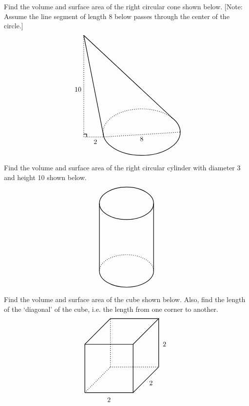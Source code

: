 \documentclass[11pt,letterpaper]{article}
\begin{document}

 Find the volume and surface area of the right circular cone shown below. [Note: Assume the line segment of length 8 below passes through the center of the circle.]
	\[
	\begin{tikzpicture}
	\draw[line width=0.03cm] (-1.96,-0.25) -- (-3,5);
	\draw[line width=0.03cm] (1.58,0.735) -- (-3,5);    
	                                                           
	\draw[line width=0.03cm,dotted] (-3,5) -- (-3,-0.25) -- (-1.96,-0.25);
	\draw[line width=0.03cm] (-3,-0.1) -- (-2.85,-0.1) -- (-2.85,-0.25);
	\node at (-3.3,2.2) {$10$};
	
	\draw[line width=0.03cm,dotted] (-1.96,-0.25) -- (2,0);
	\node at (0,-0.35) {$8$};
	
	\node at (-2.4,-0.5) {$2$};
	
	\draw[line width=0.03cm,dotted] (2, 0) arc [start angle=0, end angle=180, x radius= 2, y radius= 1.2];
	\draw[line width=0.03cm] (-2, 0) arc [start angle=180, end angle=400, x radius= 2, y radius= 1.2];	
	\end{tikzpicture}
	\]



\newpage



 Find the volume and surface area of the right circular cylinder with diameter 3 and height 10 shown below.
	\[
	\begin{tikzpicture}[scale=0.7]
	\draw[line width=0.03cm] (0,5) ellipse (2 and 1.2);
	\draw[line width=0.03cm] (-2,5) -- (-2,0);
	\draw[line width=0.03cm] (2,5) -- (2,0);
	\draw[line width=0.03cm,dotted] (2, 0) arc [start angle=0, end angle=180, x radius= 2, y radius= 1.2];
	\draw[line width=0.03cm] (-2, 0) arc [start angle=180, end angle=360, x radius= 2, y radius= 1.2];
	\end{tikzpicture}
	\]



\newpage



 Find the volume and surface area of the cube shown below. Also, find the length of the `diagonal' of the cube, i.e. the length from one corner to another. 
 	\[
	\begin{tikzpicture}[scale=2.5]
	\draw[line width=0.03cm] (0,0) -- (1,0) -- (1,1) -- (0,1) -- (0,0);
	\draw[line width=0.03cm] (0,1) -- (0.53,1.53) -- (1.53,1.53) -- (1,1);
	\draw[line width=0.03cm] (1.53,1.53) -- (1.53,0.53) -- (1,0);
	\draw[line width=0.03cm, dotted] (0,0) -- (0.53,0.53) -- (0.53,1.53);
	\draw[line width=0.03cm, dotted] (0.53,0.53) -- (1.53,0.53);
	\node at (0.5,-0.15) {$2$};
	\node at (1.37,0.2) {$2$};
	\node at (1.65,1) {$2$};
	\end{tikzpicture}
	\]
\end{document}
